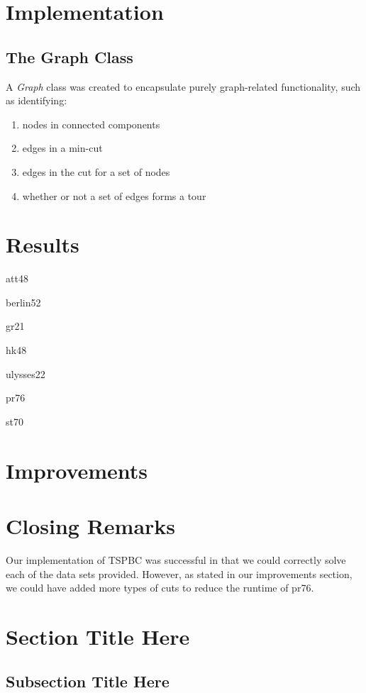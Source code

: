 \documentclass{article}
\begin{document}
\section{Implementation}

\subsection{The Graph Class}

A \textit{Graph} class was created
to encapsulate purely graph-related functionality,
such as identifying:
\begin{enumerate}
\item nodes in connected components
\item edges in a min-cut
\item edges in the cut for a set of nodes
\item whether or not a set of edges forms a tour
\end{enumerate}

\section{Results}
    att48

    berlin52

    gr21

    hk48

    ulysses22

    pr76

    st70

\section{Improvements}

\section{Closing Remarks}
Our implementation of TSPBC was successful
in that we could correctly solve
each of the data sets provided.
However, as stated in our improvements section,
we could have added more types of cuts
to reduce the runtime of pr76.


\section{Section Title Here}

\subsection{Subsection Title Here}
\end{document}
